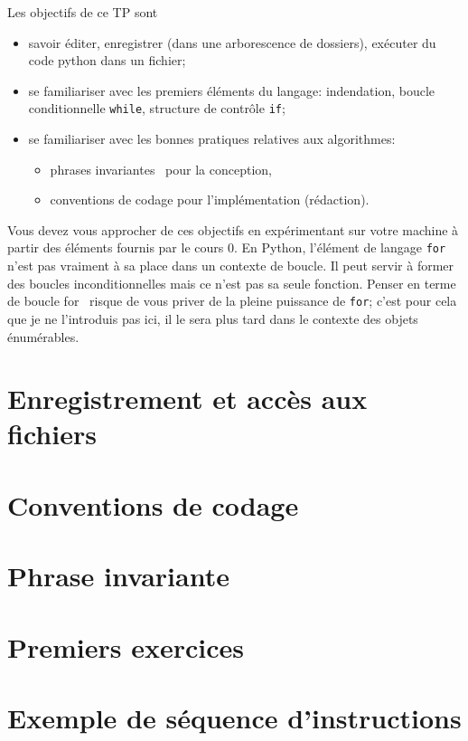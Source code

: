 

\usepackage{parcolumns}
\setlength{\parindent}{0pt}

 
Les objectifs de ce TP sont
\begin{itemize}
  \item  savoir éditer, enregistrer (dans une arborescence de dossiers), exécuter du code python dans un fichier;
  \item se familiariser avec les premiers éléments du langage: indendation, boucle conditionnelle \texttt{while}, structure de contrôle \texttt{if};
  \item se familiariser avec les bonnes pratiques relatives aux algorithmes:
  \begin{itemize}
    \item \og phrases invariantes\fg~ pour la conception,
    \item conventions de codage pour l'implémentation (rédaction).
  \end{itemize}
\end{itemize}
Vous devez vous approcher de ces objectifs en expérimentant sur votre machine à partir des éléments fournis par le \og cours 0\fg.\newline
En Python, l'élément de langage \texttt{for} n'est pas vraiment à sa place dans un contexte de boucle. Il peut servir à former des boucles inconditionnelles mais ce n'est pas sa seule fonction. Penser en terme de \og boucle for\fg~ risque de vous priver de la pleine puissance de \texttt{for}; c'est pour cela que je ne l'introduis pas ici, il le sera plus tard dans le contexte des objets \og énumérables\fg.


\section{Enregistrement et accès aux fichiers}


\section{Conventions de codage}


\section{Phrase invariante}


\section{Premiers exercices}


\section{Exemple de séquence d'instructions}


